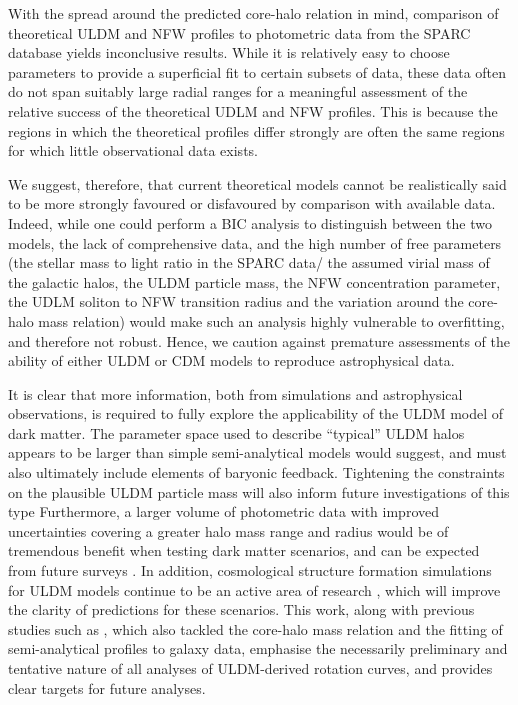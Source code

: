 \documentclass{pasa}%
\begin{document}
With the spread around the predicted core-halo relation in mind, comparison of theoretical ULDM and NFW profiles to photometric data from the SPARC database yields inconclusive results. While it is relatively easy to choose parameters to provide a superficial fit to certain subsets of data, these data often do not span suitably large radial ranges for a meaningful assessment of the relative success of the theoretical UDLM and NFW profiles. This is because the regions in which the theoretical profiles differ strongly are often the same regions for which little observational data exists. 

We suggest, therefore, that current theoretical models cannot be realistically said to be more strongly favoured or disfavoured by comparison with available data. Indeed, while one could perform a BIC analysis to distinguish between the two models, the lack of comprehensive data, and the high number of free parameters (the stellar mass to light ratio in the SPARC data/ the assumed virial mass of the galactic halos, the ULDM particle mass, the NFW concentration parameter, the UDLM soliton to NFW transition radius and the variation around the core-halo mass relation) would make such an analysis highly vulnerable to overfitting, and therefore not robust. Hence, we caution against premature assessments of the ability of either ULDM or CDM models to reproduce astrophysical data.

It is clear that more information, both from simulations and astrophysical observations, is required to fully explore the applicability of the ULDM model of dark matter. The parameter space used to describe ``typical'' ULDM halos appears to be larger than simple semi-analytical models would suggest, and must also ultimately include elements of baryonic feedback. Tightening the constraints on the plausible ULDM particle mass will also inform future investigations of this type \cite{Castellano:2019hdd, Lidz:2018fqo, Davoudiasl:2019nlo} Furthermore, a larger volume of photometric data with improved uncertainties covering a greater halo mass range and radius would be of tremendous benefit when testing dark matter scenarios, and can be expected from future surveys  \cite{Simon:2019kmm}. In addition, cosmological structure formation simulations for ULDM models continue to be an active area of research \cite{Lin:2018whl, Clough:2018exo, Mocz:2015sda}, which will improve the clarity of predictions for these scenarios. This work, along with previous studies such as \cite{Bar2018acw}, which also tackled the core-halo mass relation and the fitting of semi-analytical profiles to galaxy data, emphasise the necessarily preliminary and tentative nature of all analyses of ULDM-derived rotation curves, and provides clear targets for future analyses. 
\end{document}
